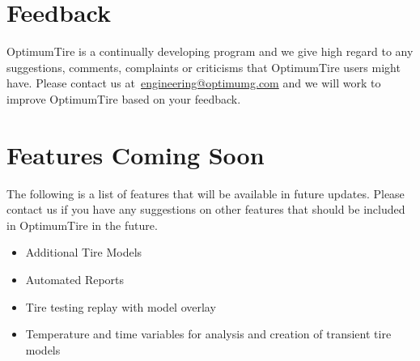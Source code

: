 \section*{Feedback}
\label{sec:Feedback}
OptimumTire is a continually developing program and we give high regard to any suggestions, comments, complaints or criticisms that OptimumTire users might have. Please contact us at~\href{mailto: engineering@optimumg.com}{engineering@optimumg.com} and we will work to improve OptimumTire based on your feedback.

\section*{Features Coming Soon}
\label{sec:FeaturesComingSoon}

The following is a list of features that will be available in future updates. Please contact us if you have any suggestions on other features that should be included in OptimumTire in the future.
\begin{itemize}
	\item Additional Tire Models
	\item Automated Reports
	\item	Tire testing replay with model overlay
	\item	Temperature and time variables for analysis and creation of transient tire models
\end{itemize}
